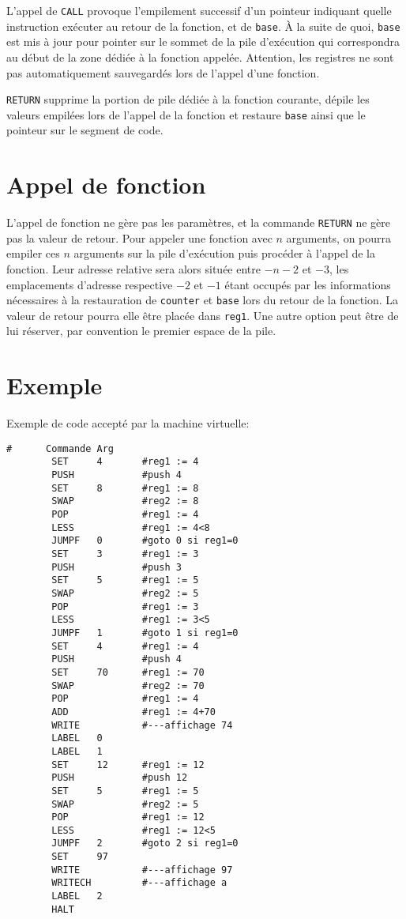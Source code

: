 \documentclass[12pt,a4paper]{article}
\begin{document}
L'appel de {\tt CALL} provoque l'empilement successif d'un pointeur
indiquant quelle instruction exécuter au
retour de la fonction, et de {\tt base}. À la suite de quoi,
{\tt base} est mis à jour pour pointer sur le sommet de la pile
d'exécution
qui correspondra au début de la zone dédiée à la fonction appelée.
Attention, les registres ne sont pas automatiquement sauvegardés lors
de l'appel d'une fonction.

{\tt RETURN} supprime la portion de pile dédiée à la fonction
courante, dépile les valeurs empilées lors de l'appel de la fonction
et restaure {\tt base} ainsi que le pointeur sur le segment de code.

\section{Appel de fonction}
L'appel de fonction ne gère pas les paramètres, et la commande
{\tt RETURN} ne gère pas la valeur de retour.  Pour appeler une
fonction avec $n$ arguments, on pourra empiler ces $n$ arguments sur
la pile d'exécution puis procéder à l'appel de la fonction. Leur
adresse relative sera alors située entre $-n-2$ et $-3$, les
emplacements d'adresse respective $-2$ et $-1$ étant occupés par les
informations nécessaires à la restauration de {\tt counter} et
{\tt base} lors du retour de la fonction.  La valeur de retour pourra
elle être placée dans {\tt reg1}. Une autre option peut être de lui
réserver, par convention le premier espace de la pile.

\section{Exemple}
Exemple de code accepté par la machine virtuelle:
\begin{verbatim}
#      Commande Arg
        SET     4       #reg1 := 4
        PUSH            #push 4
        SET     8       #reg1 := 8
        SWAP            #reg2 := 8
        POP             #reg1 := 4
        LESS            #reg1 := 4<8
        JUMPF   0       #goto 0 si reg1=0
        SET     3       #reg1 := 3
        PUSH            #push 3
        SET     5       #reg1 := 5
        SWAP            #reg2 := 5
        POP             #reg1 := 3
        LESS            #reg1 := 3<5
        JUMPF   1       #goto 1 si reg1=0
        SET     4       #reg1 := 4
        PUSH            #push 4
        SET     70      #reg1 := 70
        SWAP            #reg2 := 70
        POP             #reg1 := 4
        ADD             #reg1 := 4+70
        WRITE           #---affichage 74
        LABEL   0
        LABEL   1
        SET     12      #reg1 := 12
        PUSH            #push 12
        SET     5       #reg1 := 5
        SWAP            #reg2 := 5
        POP             #reg1 := 12 
        LESS            #reg1 := 12<5
        JUMPF   2       #goto 2 si reg1=0
        SET     97
        WRITE           #---affichage 97
        WRITECH         #---affichage a
        LABEL   2
        HALT
\end{verbatim}
\end{document}
